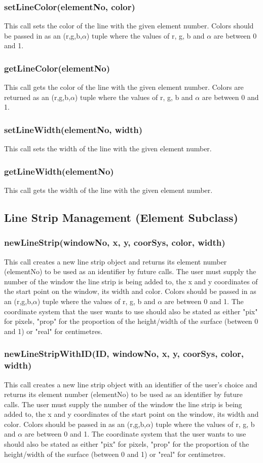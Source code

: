 \documentclass{acm_proc_article-sp}
\begin{document}
\subsubsection{setLineColor(elementNo, color)}
This call sets the color of the line with the given element number. Colors should be passed in as an (r,g,b,$\alpha$) tuple where the values of r, g, b and $\alpha$ are between 0 and 1.
\subsubsection{getLineColor(elementNo)}
This call gets the color of the line with the given element number. Colors are returned as an (r,g,b,$\alpha$) tuple where the values of r, g, b and $\alpha$ are between 0 and 1.
\subsubsection{setLineWidth(elementNo, width)}
This call sets the width of the line with the given element number.
\subsubsection{getLineWidth(elementNo)}
This call gets the width of the line with the given element number.
\subsection{Line Strip Management (Element Subclass)}
\subsubsection{newLineStrip(windowNo, x, y, coorSys, color, width)}
This call creates a new line strip object and returns its element number (elementNo) to be used as an identifier by future calls. The user must supply the number of the window the line strip is being added to, the x and y coordinates of the start point on the window, its width and color. Colors should be passed in as an (r,g,b,$\alpha$) tuple where the values of r, g, b and $\alpha$ are between 0 and 1. The coordinate system that the user wants to use should also be stated as either "pix" for pixels, "prop" for the proportion of the height/width of the surface (between 0 and 1) or "real" for centimetres.
\subsubsection{newLineStripWithID(ID, windowNo, x, y, coorSys, color, width)}
This call creates a new line strip object with an identifier of the user's choice and returns its element number (elementNo) to be used as an identifier by future calls. The user must supply the number of the window the line strip is being added to, the x and y coordinates of the start point on the window, its width and color. Colors should be passed in as an (r,g,b,$\alpha$) tuple where the values of r, g, b and $\alpha$ are between 0 and 1. The coordinate system that the user wants to use should also be stated as either "pix" for pixels, "prop" for the proportion of the height/width of the surface (between 0 and 1) or "real" for centimetres.
\end{document}

